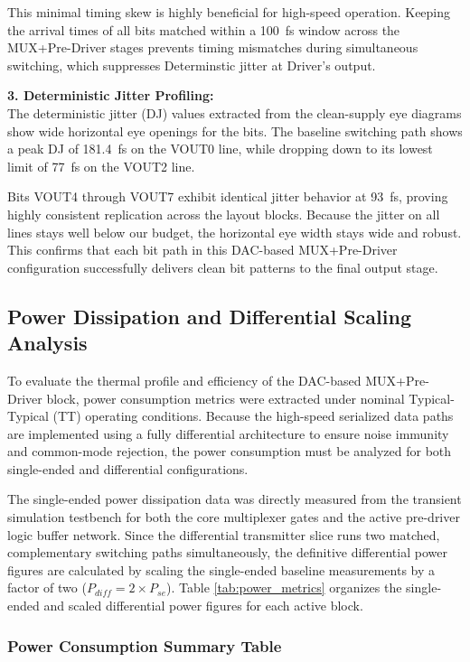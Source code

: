 This minimal timing skew is highly beneficial for high-speed operation. Keeping the arrival times of all bits matched within a 100~fs window across the MUX+Pre-Driver stages prevents timing mismatches during simultaneous switching, which suppresses Determinstic jitter at Driver's output.

\textbf{3. Deterministic Jitter Profiling:} \\
The deterministic jitter (DJ) values extracted from the clean-supply eye diagrams show wide horizontal eye openings for the bits. The baseline switching path shows a peak DJ of 181.4~fs on the VOUT0 line, while dropping down to its lowest limit of 77~fs on the VOUT2 line. 

Bits VOUT4 through VOUT7 exhibit identical jitter behavior at 93~fs, proving highly consistent replication across the layout blocks. Because the jitter on all lines stays well below our budget, the horizontal eye width stays wide and robust. This confirms that each bit path in this DAC-based MUX+Pre-Driver configuration successfully delivers clean bit patterns to the final output stage.

\clearpage

\subsection{Power Dissipation and Differential Scaling Analysis}
\label{subsec:power_dissipation}

To evaluate the thermal profile and efficiency of the DAC-based MUX+Pre-Driver block, power consumption metrics were extracted under nominal Typical-Typical (TT) operating conditions. Because the high-speed serialized data paths are implemented using a fully differential architecture to ensure noise immunity and common-mode rejection, the power consumption must be analyzed for both single-ended and differential configurations. 

The single-ended power dissipation data was directly measured from the transient simulation testbench for both the core multiplexer gates and the active pre-driver logic buffer network. Since the differential transmitter slice runs two matched, complementary switching paths simultaneously, the definitive differential power figures are calculated by scaling the single-ended baseline measurements by a factor of two ($P_{diff} = 2 \times P_{se}$). Table \ref{tab:power_metrics} organizes the single-ended and scaled differential power figures for each active block.

\subsubsection*{Power Consumption Summary Table}

